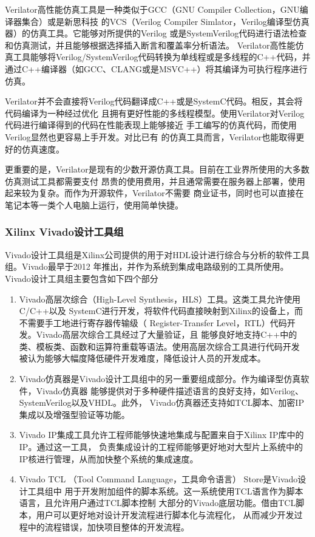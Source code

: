 Verilator高性能仿真工具是一种类似于GCC（GNU Compiler Collection，GNU编译器集合）或是新思科技
的VCS（Verilog Compiler Simlator，Verilog编译型仿真器）的仿真工具。它能够对所提供的Verilog
或是SystemVerilog代码进行语法检查和仿真测试，并且能够根据选择插入断言和覆盖率分析语法。
Verilator高性能仿真工具能够将Verilog/SystemVerilog代码转换为单线程或是多线程的C++代码，并
通过C++编译器（如GCC、CLANG或是MSVC++）将其编译为可执行程序进行仿真\cite{verilator_website}。

Verilator并不会直接将Verilog代码翻译成C++或是SystemC代码。相反，其会将代码编译为一种经过优化
且拥有更好性能的多线程模型。使用Verilator对Verilog代码进行编译得到的代码在性能表现上能够接近
手工编写的仿真代码\cite{snyder2017verilator}，而使用Verilog显然也更容易上手开发。对比已有
的仿真工具而言，Verilator也能取得更好的仿真速度\cite{snyder2013verilator}。

更重要的是，Verilator是现有的少数开源仿真工具。目前在工业界所使用的大多数仿真测试工具都需要支付
昂贵的使用费用，并且通常需要在服务器上部署，使用起来较为复杂。而作为开源软件，Verilator不需要
商业证书，同时也可以直接在笔记本等一类个人电脑上运行，使用简单快捷。

\subsubsection{Xilinx Vivado设计工具组}

Vivado设计工具组是Xilinx公司提供的用于对HDL设计进行综合与分析的软件工具组。Vivado最早于2012
年推出，并作为系统到集成电路级别的工具所使用。Vivado设计工具组主要包含如下四个部分

\begin{enumerate}
  \item Vivado高层次综合（High-Level Synthesis，HLS）工具。这类工具允许使用C/C++以及
        SystemC进行开发，将软件代码直接映射到Xilinx的设备上，而不需要手工地进行寄存器传输级（
        Register-Transfer Level，RTL）代码开发。Vivado高层次综合工具经过了大量验证，且
        能够良好地支持C++中的类、模板类、函数和运算符重载等语法。使用高层次综合工具进行代码开发
        被认为能够大幅度降低硬件开发难度，降低设计人员的开发成本。
  \item Vivado仿真器是Vivado设计工具组中的另一重要组成部分。作为编译型仿真软件，Vivado仿真器
        能够提供对于多种硬件描述语言的良好支持，如Verilog、SystemVerilog以及VHDL。此外，
        Vivado仿真器还支持如TCL脚本、加密IP集成以及增强型验证等功能。
  \item Vivado IP集成工具允许工程师能够快速地集成与配置来自于Xilinx IP库中的IP。通过这一工具，
        负责集成设计的工程师能够更好地对大型片上系统中的IP核进行管理，从而加快整个系统的集成速度。
  \item Vivado TCL （Tool Command Language，工具命令语言） Store是Vivado设计工具组中
        用于开发附加组件的脚本系统。这一系统使用TCL语言作为脚本语言，且允许用户通过TCL脚本控制
        大部分的Vivado底层功能。借由TCL脚本，用户可以更好地对设计开发流程进行脚本化与流程化，
        从而减少开发过程中的流程错误，加快项目整体的开发流程。
\end{enumerate}

